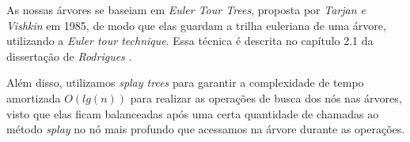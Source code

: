 As nossas árvores se baseiam em \textit{Euler Tour Trees}, proposta por \textit{Tarjan e Vishkin} \cite{tarjan} em 1985, de modo que elas guardam a trilha euleriana de uma árvore, utilizando a \textit{Euler tour technique}. Essa técnica é descrita no capítulo 2.1 da dissertação de \textit{Rodrigues} \cite{arthur}.   

Além disso, utilizamos \textit{splay trees} para garantir a complexidade de tempo amortizada $O(lg(n))$ para realizar as operações de busca dos nós nas árvores, visto que elas ficam balanceadas após uma certa quantidade de chamadas ao método \textit{splay} no nó mais profundo que acessamos na árvore durante as operações.  
